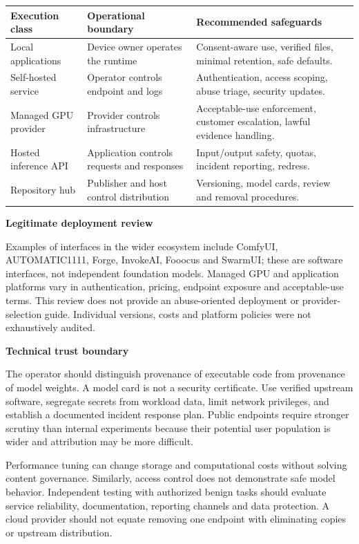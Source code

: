 \documentclass[10pt,a4paper]{article}
\newcommand{\sub}[1]{\vspace{1mm}\textbf{#1}\par}
\begin{document}
\begin{center}\small\begin{tabularx}{\linewidth}{@{}YYY@{}}\toprule
\textbf{Execution class} & \textbf{Operational boundary} & \textbf{Recommended safeguards}\\\midrule
Local applications & Device owner operates the runtime & Consent-aware use, verified files, minimal retention, safe defaults.\\
Self-hosted service & Operator controls endpoint and logs & Authentication, access scoping, abuse triage, security updates.\\
Managed GPU provider & Provider controls infrastructure & Acceptable-use enforcement, customer escalation, lawful evidence handling.\\
Hosted inference API & Application controls requests and responses & Input/output safety, quotas, incident reporting, redress.\\
Repository hub & Publisher and host control distribution & Versioning, model cards, review and removal procedures.\\\bottomrule\end{tabularx}\end{center}

\sub{Legitimate deployment review}

Examples of interfaces in the wider ecosystem include ComfyUI, AUTOMATIC1111, Forge, InvokeAI, Fooocus and SwarmUI; these are software interfaces, not independent foundation models. Managed GPU and application platforms vary in authentication, pricing, endpoint exposure and acceptable-use terms. This review does not provide an abuse-oriented deployment or provider-selection guide. Individual versions, costs and platform policies were not exhaustively audited.


\sub{Technical trust boundary}

The operator should distinguish provenance of executable code from provenance of model weights. A model card is not a security certificate. Use verified upstream software, segregate secrets from workload data, limit network privileges, and establish a documented incident response plan. Public endpoints require stronger scrutiny than internal experiments because their potential user population is wider and attribution may be more difficult.


Performance tuning can change storage and computational costs without solving content governance. Similarly, access control does not demonstrate safe model behavior. Independent testing with authorized benign tasks should evaluate service reliability, documentation, reporting channels and data protection. A cloud provider should not equate removing one endpoint with eliminating copies or upstream distribution.
\end{document}

